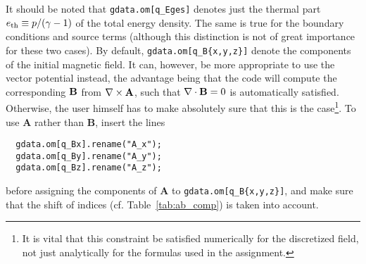 It should be noted that {\tt gdata.om[q\_Eges]} denotes just the thermal
part $e_{\rm th} \equiv p/(\gamma-1)$ of the total energy density. The same
is true for the boundary conditions and source terms (although this
distinction is not of great importance for these two cases).
By default, {\tt gdata.om[q\_B\{x,y,z\}]} denote the components of the initial
magnetic field. It can, however, be more appropriate to use the vector
potential instead, the advantage being that the code will
compute the corresponding ${\bf B}$ from $\nabla \times {\bf A}$, such
that $\nabla \cdot {\bf B}=0$ is automatically satisfied. Otherwise,
the user himself has to make absolutely sure that this is the
case\footnote{It is vital that this constraint be satisfied numerically
for the discretized field, not just analytically for the formulas used
in the assignment.}.
To use {\bf A} rather than {\bf B}, insert the lines
\begin{verbatim}
  gdata.om[q_Bx].rename("A_x");
  gdata.om[q_By].rename("A_y");
  gdata.om[q_Bz].rename("A_z");
\end{verbatim}
before assigning the components of {\bf A} to {\tt gdata.om[q\_B\{x,y,z\}]},
and make sure that the shift of indices (cf. Table~\ref{tab:ab_comp})
is taken into account.

